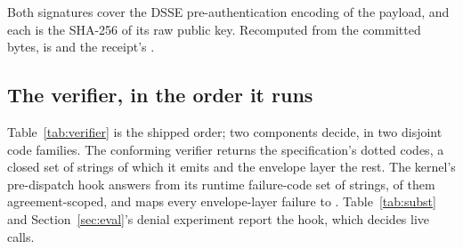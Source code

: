 Both signatures cover the DSSE pre-authentication encoding of the payload, and
each  is the SHA-256 of its raw public key. Recomputed from the
committed bytes,  is  and the
receipt's .

\subsection{The verifier, in the order it runs}

Table~\ref{tab:verifier} is the shipped order; two components decide, in two
disjoint code families. The conforming verifier returns the specification's
dotted codes, a closed set of \PSRejectionCodeCount{} strings of which it
emits \PSVerifierCodeCount{} and the envelope layer the rest. The kernel's
pre-dispatch hook answers from its runtime failure-code set of
\PSRuntimeCodeCount{} strings, \PSRuntimeTreatyCodeCount{} of them
agreement-scoped, and maps every envelope-layer failure to
. Table~\ref{tab:subst} and
Section~\ref{sec:eval}'s denial experiment report the hook, which decides live
calls.
